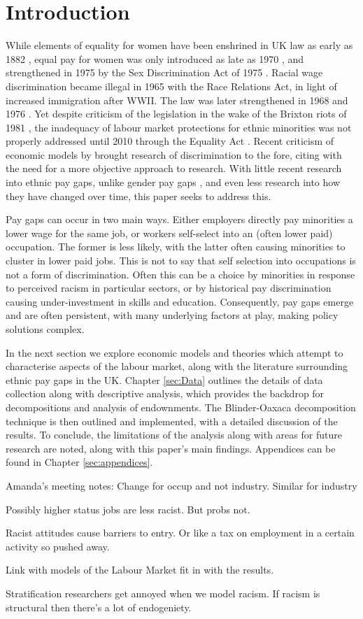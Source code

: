 \documentclass[class=article, crop=false]{standalone}
\begin{document}
\section{Introduction}
\label{sec:introduction}
While elements of equality for women have been enshrined in UK law as early as 1882 \citep{GOVb}, equal pay for women was only introduced as late as 1970 \citep{GOVc}, and strengthened in 1975 by the Sex Discrimination Act of 1975 \citep{GOVd}. Racial wage discrimination became illegal in 1965 \citep{GOV} with the Race Relations Act, in light of increased immigration after WWII. The law was later strengthened in 1968 and 1976 \citep{Sooben}. Yet despite criticism of the legislation in the wake of the Brixton riots of 1981 \citep{Solomos}, the inadequacy of labour market protections for ethnic minorities was not properly addressed until 2010 through the Equality Act \citep{Brown}. Recent criticism of economic models by \citet{Spriggs} brought research of discrimination to the fore, citing with the need for a more objective approach to research. With little recent research into ethnic pay gaps, unlike gender pay gaps \citep{Metcalf}, and even less research into how they have changed over time, this paper seeks to address this.

Pay gaps can occur in two main ways. Either employers directly pay minorities a lower wage for the same job, or workers self-select into an (often lower paid) occupation. The former is less likely, with the latter often causing minorities to cluster in lower paid jobs. This is not to say that self selection into occupations is not a form of discrimination. Often this can be a choice by minorities in response to perceived racism in particular sectors, or by historical pay discrimination causing under-investment in skills and education. Consequently, pay gaps emerge and are often persistent, with many underlying factors at play, making policy solutions complex.

In the next section we explore economic models and theories which attempt to characterise aspects of the labour market, along with the literature surrounding ethnic pay gaps in the UK. Chapter \ref{sec:Data} outlines the details of data collection along with descriptive analysis, which provides the backdrop for decompositions and analysis of endownments. The Blinder-Oaxaca decomposition technique is then outlined and implemented, with a detailed discussion of the results. To conclude, the limitations of the analysis along with areas for future research are noted, along with this paper's main findings. Appendices can be found in Chapter \ref{sec:appendices}.

Amanda's meeting notes:
Change for occup and not industry. 
Similar for industry

Possibly higher status jobs are less racist. But probs not. 

Racist attitudes cause barriers to entry. Or like a tax on employment in a certain activity so pushed away.

Link with models of the Labour Market fit in with the results. 

Stratification researchers get annoyed when we model racism. If racism is structural then there's a lot of endogeniety. 

\ifstandalone

\fi
\end{document}
